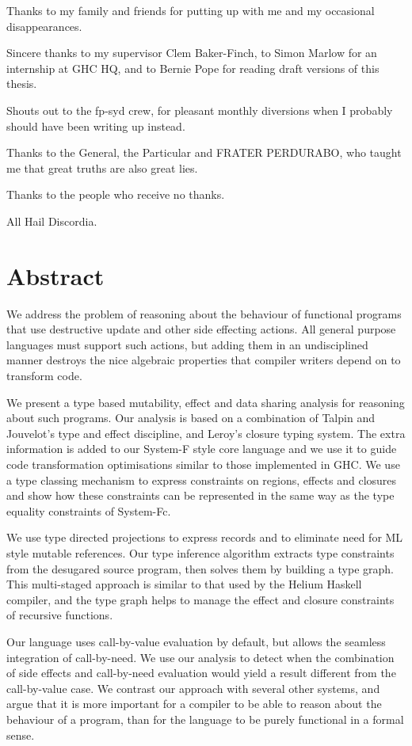 \documentclass[a4paper,11pt]{book}
\begin{document}
Thanks to my family and friends for putting up with me and my occasional disappearances.

Sincere thanks to my supervisor Clem Baker-Finch, to Simon Marlow for an internship at GHC HQ, and to Bernie Pope for reading draft versions of this thesis.

Shouts out to the fp-syd crew, for pleasant monthly diversions when I probably should have been writing up instead.

Thanks to the General, the Particular and FRATER PERDURABO, who taught me that great truths are also great lies.

Thanks to the people who receive no thanks.

All Hail Discordia.


\chapter*{Abstract}\label{abstract}

We address the problem of reasoning about the behaviour of functional programs that use destructive update and other side effecting actions. All general purpose languages must support such actions, but adding them in an undisciplined manner destroys the nice algebraic properties that compiler writers depend on to transform code.

We present a type based mutability, effect and data sharing analysis for reasoning about such programs. Our analysis is based on a combination of Talpin and Jouvelot's type and effect discipline, and Leroy's closure typing system. The extra information is added to our System-F style core language and we use it to guide code transformation optimisations similar to those implemented in GHC. We use a type classing mechanism to express constraints on regions, effects and closures and show how these constraints can be represented in the same way as the type equality constraints of System-Fc. 

We use type directed projections to express records and to eliminate need for ML style mutable references. Our type inference algorithm extracts type constraints from the desugared source program, then solves them by building a type graph. This multi-staged approach is similar to that used by the Helium Haskell compiler, and the type graph helps to manage the effect and closure constraints of recursive functions. 

Our language uses call-by-value evaluation by default, but allows the seamless integration of call-by-need. We use our analysis to detect when the combination of side effects and call-by-need evaluation would yield a result different from the call-by-value case. We contrast our approach with several other systems, and argue that it is more important for a compiler to be able to reason about the behaviour of a program, than for the language to be purely functional in a formal sense.
\end{document}
